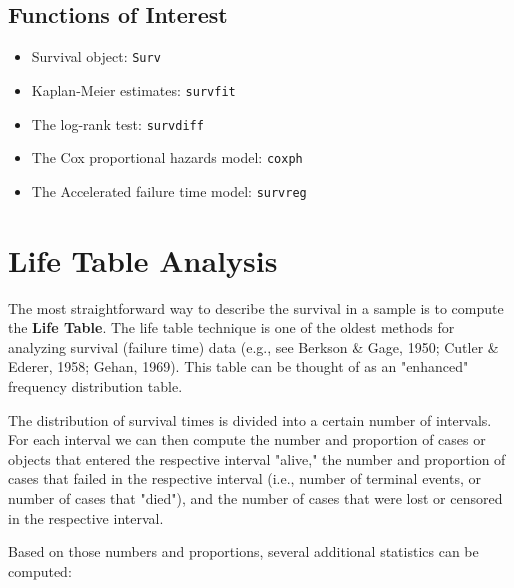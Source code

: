 \documentclass[11pt]{article} %
\begin{document}
\subsection{Functions of Interest}
\begin{itemize}
\item Survival object: \texttt{Surv}
\item Kaplan-Meier estimates: \texttt{survfit}
\item The log-rank test: \texttt{survdiff}
\item The Cox proportional hazards model: \texttt{coxph}
\item The Accelerated failure time model: \texttt{survreg}
\end{itemize}



\newpage

\section{Life Table Analysis}

The most straightforward way to describe the survival in a sample is to compute the \textbf{Life Table}. The life table technique is one of the oldest methods for analyzing survival (failure time) data (e.g., see Berkson \& Gage, 1950; Cutler \& Ederer, 1958; Gehan, 1969). This table can be thought of as an "enhanced" frequency distribution table. 

The distribution of survival times is divided into a certain number of intervals. For each interval we can then compute the number and proportion of cases or objects that entered the respective interval "alive," the number and proportion of cases that failed in the respective interval (i.e., number of terminal events, or number of cases that "died"), and the number of cases that were lost or censored in the respective interval.

Based on those numbers and proportions, several additional statistics can be computed:

\end{document}

